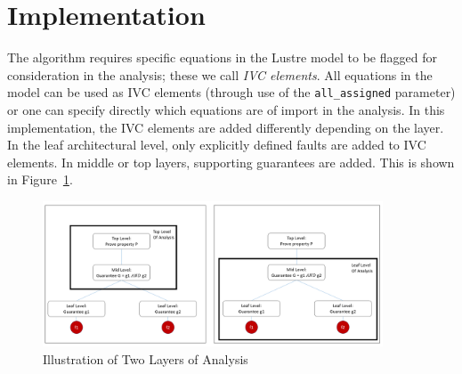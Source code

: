 \section{Implementation}
\label{sec:impl}

The \aivcalg algorithm requires  specific equations in the Lustre model to be flagged for consideration in the analysis; these we call \emph{IVC elements}. All equations in the model can be used as IVC elements (through use of the \texttt{all\_assigned} parameter) or one can specify directly which equations are of import in the analysis. In this implementation, the IVC elements are added differently depending on the layer. In the leaf architectural level, only explicitly defined faults are added to IVC elements. In middle or top layers, supporting guarantees are added. This is shown in Figure~\ref{fig:layers}. 

\begin{figure}[h!]
	\begin{center}
		\includegraphics[width=0.9\textwidth]{images/twoLevels.PNG}
	\end{center}
	\vspace{-2em}
	\caption{Illustration of Two Layers of Analysis}
	\label{fig:layers}
	\vspace{-2em}
\end{figure}

